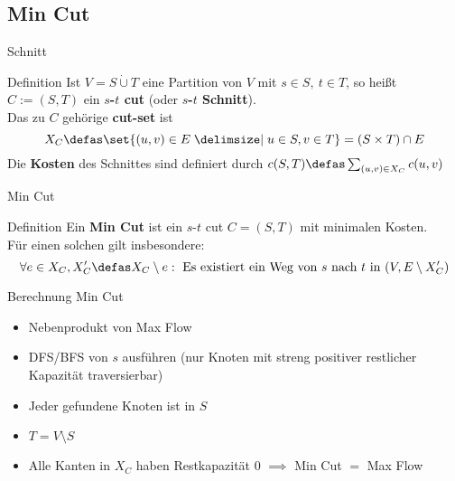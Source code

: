 \subsection{Min Cut}
\begin{frame}{Schnitt}
    \begin{block}{Definition}
        \pause Ist \(V = S \dot{\cup} T\) eine Partition von \(V\) mit \(s \in S, \ t \in T\), so heißt \(C := (S, T)\) ein \textbf{$s$-$t$ cut} (oder \textbf{$s$-$t$ Schnitt}).\\\pause
        Das zu $C$ gehörige \textbf{cut-set} ist
        \[X_C \defas \set{(u, v) \in E \given u \in S, v \in T} = (S\times
        T)\cap E\]
        \pause
        Die \textbf{Kosten} des Schnittes sind definiert durch
        \(c(S, T) \defas \sum\nolimits_{(u, v) \in X_C} c(u, v)\)
    \end{block}
\end{frame}

\begin{frame}{Min Cut}
    \begin{block}{Definition}
        \pause Ein \textbf{Min Cut} ist ein $s$-$t$ cut \(C = (S, T)\) mit minimalen Kosten.\\\pause
        Für einen solchen gilt insbesondere:
        \[\forall e \in X_C, X_C' \defas X_C \setminus e :
        \text{ Es existiert ein Weg von $s$ nach $t$ in } (V, E \setminus X_C')\]
    \end{block}
\end{frame}

\begin{frame}{Berechnung Min Cut}
    \begin{itemize}
        \item Nebenprodukt von Max Flow
        \pause\item DFS/BFS von $s$ ausführen (nur Knoten mit streng positiver restlicher Kapazität
        traversierbar)
        \pause\item Jeder gefundene Knoten ist in $S$
        \pause\item \(T = V\setminus S\)
        \pause\item Alle Kanten in $X_C$ haben Restkapazität $0$ \(\implies\) Min
        Cut $=$ Max Flow
    \end{itemize}
\end{frame}

